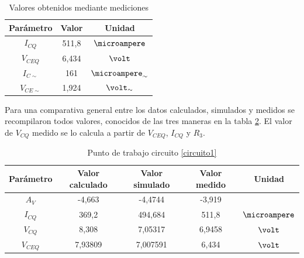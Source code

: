 \documentclass[12pt,letterpaper]{article}     %
\begin{document}
{\begin{table}[!ht]
	\begin{center}
		\begin{tabular}{| c | c | c |}
			\hline
			\textbf{Parámetro} & \textbf{Valor} & \textbf{Unidad}\\ 
			\hline
			{$I_{CQ}$} & {511,8} & {$\microampere$}\\
			\hline
			{$V_{CEQ}$} & {6,434} & {$\volt$}\\
			\hline
			{$I_{C\sim}$} & {161} & {$\microampere_{\sim}$}\\
			\hline
			{$V_{CE\sim}$} & {1,924} & {$\volt_{\sim}$}\\
			\hline
		\end{tabular}
	\end{center}
	\caption{Valores obtenidos mediante mediciones}
\label{tab:PuntoDeTrabajoMeida}
\end{table}

Para una comparativa general entre los datos calculados, simulados y medidos
se recompilaron todos valores, conocidos de las tres maneras
en la tabla \ref{tab:ComparativaFinal}.
El valor de $V_{CQ}$ medido se lo calcula a partir de $V_{CEQ}$, $I_{CQ}$ y $R_3$.

\begin{table}[!ht]
	\begin{center}
		\begin{tabular}{| c | c | c | c | c |}
			\hline
			\textbf{Parámetro} & \textbf{Valor calculado} & \textbf{Valor simulado} & \textbf{Valor medido} & \textbf{Unidad}\\ 
			\hline
			{$A_V$} & {-4,663}  & {-4,4744}& {-3,919} & {} \\
			\hline
			{$I_{CQ}$} & {369,2} & {494,684} & {511,8} & {$\microampere$}\\
			\hline
			{$V_{CQ}$} & {8,308} & {7,05317} & {6,9458} & {$\volt$}\\
			\hline
			{$V_{CEQ}$} & {7,93809} & {7,007591} & {6,434} & {$\volt$}\\
			\hline
		\end{tabular}
	\end{center}
	\caption{Punto de trabajo circuito \ref{circuito1}}
\label{tab:ComparativaFinal}
\end{table}

\newpage
\subsection{}

}
\end{document}
